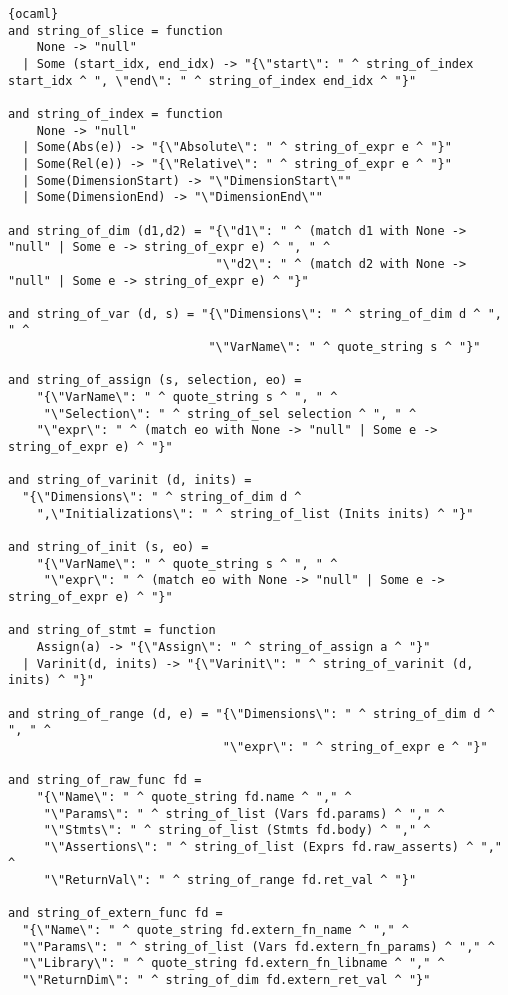 \begin{lstlisting}{ocaml}
and string_of_slice = function
    None -> "null"
  | Some (start_idx, end_idx) -> "{\"start\": " ^ string_of_index start_idx ^ ", \"end\": " ^ string_of_index end_idx ^ "}"

and string_of_index = function
    None -> "null"
  | Some(Abs(e)) -> "{\"Absolute\": " ^ string_of_expr e ^ "}"
  | Some(Rel(e)) -> "{\"Relative\": " ^ string_of_expr e ^ "}"
  | Some(DimensionStart) -> "\"DimensionStart\""
  | Some(DimensionEnd) -> "\"DimensionEnd\""

and string_of_dim (d1,d2) = "{\"d1\": " ^ (match d1 with None -> "null" | Some e -> string_of_expr e) ^ ", " ^
                             "\"d2\": " ^ (match d2 with None -> "null" | Some e -> string_of_expr e) ^ "}"

and string_of_var (d, s) = "{\"Dimensions\": " ^ string_of_dim d ^ ", " ^
                            "\"VarName\": " ^ quote_string s ^ "}"

and string_of_assign (s, selection, eo) =
    "{\"VarName\": " ^ quote_string s ^ ", " ^
     "\"Selection\": " ^ string_of_sel selection ^ ", " ^
    "\"expr\": " ^ (match eo with None -> "null" | Some e -> string_of_expr e) ^ "}"

and string_of_varinit (d, inits) =
  "{\"Dimensions\": " ^ string_of_dim d ^
    ",\"Initializations\": " ^ string_of_list (Inits inits) ^ "}"

and string_of_init (s, eo) =
    "{\"VarName\": " ^ quote_string s ^ ", " ^
     "\"expr\": " ^ (match eo with None -> "null" | Some e -> string_of_expr e) ^ "}"

and string_of_stmt = function
    Assign(a) -> "{\"Assign\": " ^ string_of_assign a ^ "}"
  | Varinit(d, inits) -> "{\"Varinit\": " ^ string_of_varinit (d, inits) ^ "}"

and string_of_range (d, e) = "{\"Dimensions\": " ^ string_of_dim d ^ ", " ^
                              "\"expr\": " ^ string_of_expr e ^ "}"

and string_of_raw_func fd =
    "{\"Name\": " ^ quote_string fd.name ^ "," ^
     "\"Params\": " ^ string_of_list (Vars fd.params) ^ "," ^
     "\"Stmts\": " ^ string_of_list (Stmts fd.body) ^ "," ^
     "\"Assertions\": " ^ string_of_list (Exprs fd.raw_asserts) ^ "," ^
     "\"ReturnVal\": " ^ string_of_range fd.ret_val ^ "}"

and string_of_extern_func fd =
  "{\"Name\": " ^ quote_string fd.extern_fn_name ^ "," ^
  "\"Params\": " ^ string_of_list (Vars fd.extern_fn_params) ^ "," ^
  "\"Library\": " ^ quote_string fd.extern_fn_libname ^ "," ^
  "\"ReturnDim\": " ^ string_of_dim fd.extern_ret_val ^ "}"


\end{lstlisting}
